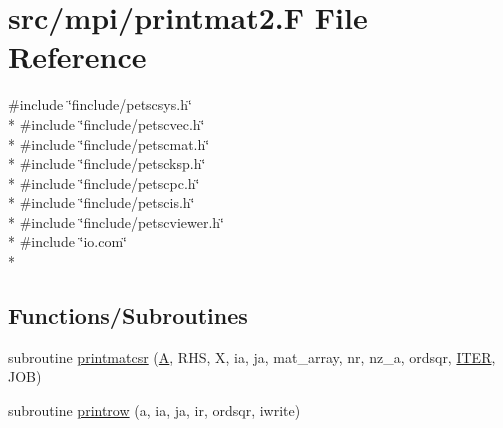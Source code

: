\hypertarget{mpi_2printmat2_8_f}{\section{src/mpi/printmat2.F File Reference}
\label{mpi_2printmat2_8_f}
}
{\ttfamily \#include \char`\"{}finclude/petscsys.\-h\char`\"{}}\\*
{\ttfamily \#include \char`\"{}finclude/petscvec.\-h\char`\"{}}\\*
{\ttfamily \#include \char`\"{}finclude/petscmat.\-h\char`\"{}}\\*
{\ttfamily \#include \char`\"{}finclude/petscksp.\-h\char`\"{}}\\*
{\ttfamily \#include \char`\"{}finclude/petscpc.\-h\char`\"{}}\\*
{\ttfamily \#include \char`\"{}finclude/petscis.\-h\char`\"{}}\\*
{\ttfamily \#include \char`\"{}finclude/petscviewer.\-h\char`\"{}}\\*
{\ttfamily \#include \char`\"{}io.\-com\char`\"{}}\\*
\subsection*{Functions/\-Subroutines}
\begin{DoxyCompactItemize}
\item 
subroutine \hyperlink{mpi_2printmat2_8_f_a3d606242ecda94a05ac2bd0d4108a356}{printmatcsr} (\hyperlink{ibc2_8com_ad2108d58343608772fff791c23da58f5}{A}, R\-H\-S, X, ia, ja, mat\-\_\-array, nr, nz\-\_\-a, ordsqr, \hyperlink{conv_8com_a5e8268d7a99a27a3889882b8cb685176}{I\-T\-E\-R}, J\-O\-B)
\item 
subroutine \hyperlink{mpi_2printmat2_8_f_ac7291e9672c04990f0d3da5e93f00cc3}{printrow} (a, ia, ja, ir, ordsqr, iwrite)
\end{DoxyCompactItemize}


